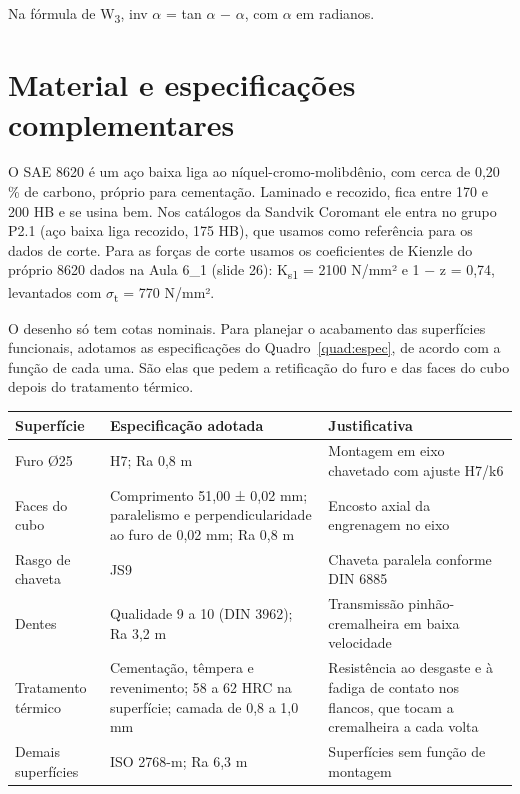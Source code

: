 Na fórmula de W\textsubscript{3}, inv $\alpha$ = tan $\alpha$ $-$ $\alpha$, com $\alpha$ em radianos.

\section{Material e especificações complementares}

O SAE 8620 é um aço baixa liga ao níquel-cromo-molibdênio, com cerca de 0,20\,\% de carbono, próprio para cementação. Laminado e recozido, fica entre 170 e 200 HB e se usina bem. Nos catálogos da Sandvik Coromant ele entra no grupo P2.1 (aço baixa liga recozido, 175 HB), que usamos como referência para os dados de corte. Para as forças de corte usamos os coeficientes de Kienzle do próprio 8620 dados na Aula 6\_1 (slide 26): K\textsubscript{s1} = 2100 N/mm² e 1 $-$ z = 0,74, levantados com $\sigma$\textsubscript{t} = 770 N/mm².

O desenho só tem cotas nominais. Para planejar o acabamento das superfícies funcionais, adotamos as especificações do Quadro~\ref{quad:espec}, de acordo com a função de cada uma. São elas que pedem a retificação do furo e das faces do cubo depois do tratamento térmico.

\begin{quadro}[H]
\centering
\caption{Especificações adotadas para as superfícies funcionais}\label{quad:espec}
{\small\renewcommand{\arraystretch}{1.2}
\begin{tabular}{|>{\raggedright\arraybackslash}p{}|>{\raggedright\arraybackslash}p{}|>{\raggedright\arraybackslash}p{}|}
\hline
\rowcolor{cinza} \textbf{Superfície} & \textbf{Especificação adotada} & \textbf{Justificativa} \\ \hline
Furo Ø25 & H7; Ra 0,8 \textmu{}m & Montagem em eixo chavetado com ajuste H7/k6 \\ \hline
Faces do cubo & Comprimento 51,00 ± 0,02 mm; paralelismo e perpendicularidade ao furo de 0,02 mm; Ra 0,8 \textmu{}m & Encosto axial da engrenagem no eixo \\ \hline
Rasgo de chaveta & 8 JS9 & Chaveta paralela conforme DIN 6885 \\ \hline
Dentes & Qualidade 9 a 10 (DIN 3962); Ra 3,2 \textmu{}m & Transmissão pinhão-cremalheira em baixa velocidade \\ \hline
Tratamento térmico & Cementação, têmpera e revenimento; 58 a 62 HRC na superfície; camada de 0,8 a 1,0 mm & Resistência ao desgaste e à fadiga de contato nos flancos, que tocam a cremalheira a cada volta \\ \hline
Demais superfícies & ISO 2768-m; Ra 6,3 \textmu{}m & Superfícies sem função de montagem \\ \hline
\end{tabular}}
\end{quadro}

